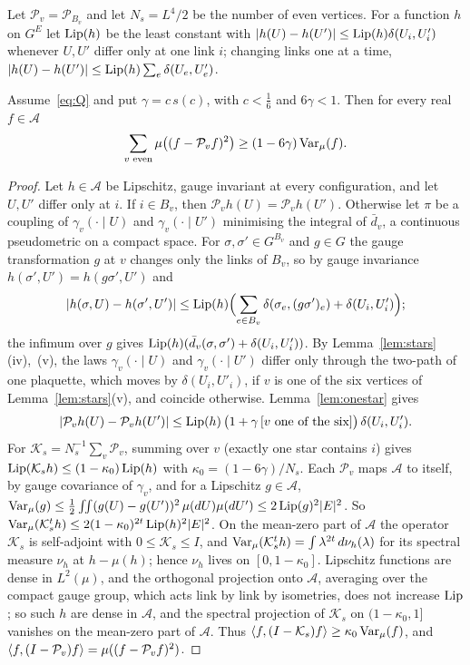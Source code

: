 Let $\mathcal P_v=\mathcal P_{B_v}$ and let $N_s=L^4/2$ be the number of even
vertices. For a function $h$ on $G^E$ let $\operatorname{Lip}(h)$ be the least constant
with $|h(U)-h(U')|\le\operatorname{Lip}(h)\delta(U_i,U'_i)$ whenever $U,U'$ differ only at
one link $i$; changing links one at a time, $|h(U)-h(U')|\le\operatorname{Lip}(h)\sum_e
\delta(U_e,U'_e)$.

\begin{proposition}\label{prop:starcond}
Assume~\eqref{eq:Q} and put $\gamma=c\,s(c)$, with $c<\frac16$ and $6\gamma<1$.
Then for every real $f\in\mathcal A$
\[
\sum_{v\text{ even}}\mu\bigl((f-\mathcal P_vf)^2\bigr)\ge(1-6\gamma)\operatorname{Var}_\mu(f).
\]
\end{proposition}

\begin{proof}
Let $h\in\mathcal A$ be Lipschitz, gauge invariant at every configuration, and
let $U,U'$ differ only at $i$. If $i\in B_v$, then $\mathcal P_vh(U)=\mathcal
P_vh(U')$. Otherwise let $\pi$ be a coupling of $\gamma_v(\cdot\mid U)$ and
$\gamma_v(\cdot\mid U')$ minimising the integral of $\bar d_v$, a continuous
pseudometric on a compact space. For $\sigma,\sigma'\in G^{B_v}$ and $g\in G$
the gauge transformation $g$ at $v$ changes only the links of $B_v$, so by
gauge invariance $h(\sigma',U')=h(g\sigma',U')$ and
\[
|h(\sigma,U)-h(\sigma',U')|\le\operatorname{Lip}(h)\Bigl(\sum_{e\in B_v}\delta(\sigma_e,
(g\sigma')_e)+\delta(U_i,U'_i)\Bigr);
\]
the infimum over $g$ gives $\operatorname{Lip}(h)(\bar d_v(\sigma,\sigma')+\delta(U_i,U'_i))$.
By Lemma~\ref{lem:stars}(iv),~(v), the laws $\gamma_v(\cdot\mid U)$ and
$\gamma_v(\cdot\mid U')$ differ only through the two-path of one plaquette,
which moves by $\delta(U_i,U'_i)$, if $v$ is one of the six vertices of
Lemma~\ref{lem:stars}(v), and coincide otherwise. Lemma~\ref{lem:onestar}
gives
\[
|\mathcal P_vh(U)-\mathcal P_vh(U')|\le\operatorname{Lip}(h)\,\bigl(1+\gamma\,[v\text{ one of
the six}]\bigr)\,\delta(U_i,U'_i).
\]
For $\mathcal K_s=N_s^{-1}\sum_v\mathcal P_v$, summing over $v$ (exactly one
star contains $i$) gives $\operatorname{Lip}(\mathcal K_sh)\le(1-\kappa_0)\operatorname{Lip}(h)$ with
$\kappa_0=(1-6\gamma)/N_s$. Each $\mathcal P_v$ maps $\mathcal A$ to itself, by
gauge covariance of $\gamma_v$, and for a Lipschitz $g\in\mathcal A$,
$\operatorname{Var}_\mu(g)\le\frac12\iint(g(U)-g(U'))^2\,\mu(dU)\mu(dU')\le2\operatorname{Lip}(g)^2|E|^2$.
So $\operatorname{Var}_\mu(\mathcal K_s^th)\le2(1-\kappa_0)^{2t}\operatorname{Lip}(h)^2|E|^2$. On the
mean-zero part of $\mathcal A$ the operator $\mathcal K_s$ is self-adjoint with
$0\le\mathcal K_s\le I$, and $\operatorname{Var}_\mu(\mathcal K_s^th)=\int\lambda^{2t}\,
d\nu_h(\lambda)$ for its spectral measure $\nu_h$ at $h-\mu(h)$; hence $\nu_h$
lives on $[0,1-\kappa_0]$. Lipschitz functions are dense in $L^2(\mu)$, and
the orthogonal projection onto $\mathcal A$, averaging over the compact gauge
group, which acts link by link by isometries, does not increase $\operatorname{Lip}$; so
such $h$ are dense in $\mathcal A$, and the spectral projection of $\mathcal K_s$
on $(1-\kappa_0,1]$ vanishes on the mean-zero part of $\mathcal A$. Thus
$\langle f,(I-\mathcal K_s)f\rangle\ge\kappa_0\operatorname{Var}_\mu(f)$, and $\langle f,(I-\mathcal P_v)f\rangle=
\mu((f-\mathcal P_vf)^2)$.
\end{proof}

